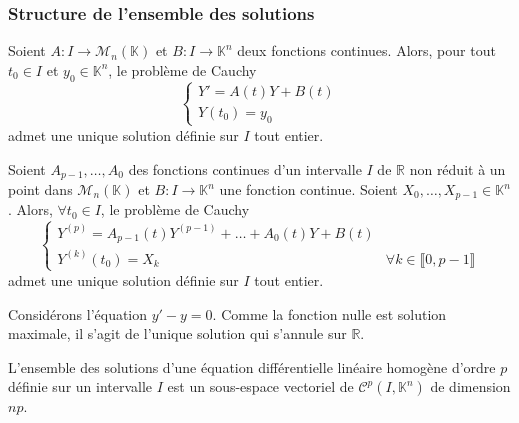   \subsubsection{Structure de l'ensemble des solutions}


  \begin{theorem}
    Soient $A : I \rightarrow \mathcal{M}_n(\mathbb{K})$ et $B : I \rightarrow \mathbb{K}^n$ deux fonctions continues. Alors, pour tout $t_0 \in I$ et $y_0 \in \mathbb{K}^n$, le problème de Cauchy
    \[ \begin{cases} Y' = A(t)Y + B(t) \\ Y(t_0) = y_0 \end{cases} \]
    admet une unique solution définie sur $I$ tout entier.
  \end{theorem}


  \begin{remark}
    Soient $A_{p-1}, \dots, A_0$ des fonctions continues d'un intervalle $I$ de $\mathbb{R}$ non réduit à un point dans $\mathcal{M}_n(\mathbb{K})$ et $B : I \rightarrow \mathbb{K}^n$ une fonction continue. Soient $X_0, \dots, X_{p-1} \in \mathbb{K}^n$. Alors, $\forall t_0 \in I$, le problème de Cauchy
    \[ \begin{cases} Y^{(p)} = A_{p-1}(t) Y^{(p-1)} + \dots + A_0(t) Y + B(t) & \\ Y^{(k)}(t_0) = X_k & \forall k \in \llbracket 0, p-1 \rrbracket \end{cases} \]
    admet une unique solution définie sur $I$ tout entier.
  \end{remark}


  \begin{example}
    Considérons l'équation $y' - y = 0$. Comme la fonction nulle est solution maximale, il s'agit de l'unique solution qui s'annule sur $\mathbb{R}$.
  \end{example}


  \begin{corollary}
    L'ensemble des solutions d'une équation différentielle linéaire homogène d'ordre $p$ définie sur un intervalle $I$ est un sous-espace vectoriel de $\mathcal{C}^p(I, \mathbb{K}^n)$ de dimension $np$.
  \end{corollary}


